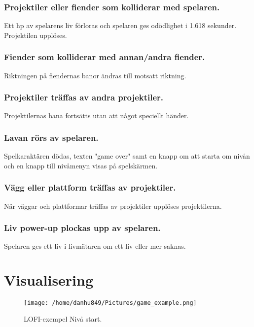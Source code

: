 \documentclass{TDP005mall}
\begin{document}
\subsubsection{Projektiler eller fiender som kolliderar med spelaren.}
Ett hp av spelarens liv förloras och spelaren ges odödlighet i 1.618 sekunder. Projektilen upplöses.

\subsubsection{Fiender som kolliderar med annan/andra fiender.}
Riktningen på fiendernas banor ändras till motsatt riktning.

\subsubsection{Projektiler träffas av andra projektiler.}
Projektilernas bana fortsätts utan att något speciellt händer.

\subsubsection{Lavan rörs av spelaren.}
Spelkaraktären dödas, texten "game over" samt en knapp om att starta om nivån och en knapp till nivåmenyn visas på spelskärmen.

\subsubsection{Vägg eller plattform träffas av projektiler.}
När väggar och plattformar träffas av projektiler upplöses projektilerna.

\subsubsection{Liv power-up plockas upp av spelaren.}
Spelaren ges ett liv i livmätaren om ett liv eller mer saknas. 

\newpage
\section{Visualisering}%

\begin{figure}[h!]
  \centerline{\texttt{[image: /home/danhu849/Pictures/game\_example.png]}}
  \caption{LOFI-exempel Nivå start.\label{fig:4}}
\end{figure}
\end{document}
